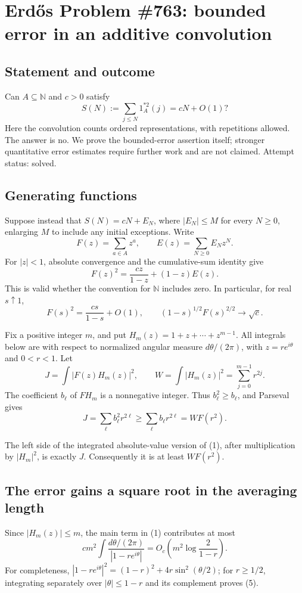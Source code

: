 \section*{Erd\H{o}s Problem \#763: bounded error in an additive convolution}
\subsection*{Statement and outcome}
Can \(A\subseteq\mathbb N\) and \(c>0\) satisfy
\[
S(N):=\sum_{j\leq N}1_A^{*2}(j)=cN+O(1)?
\]
Here the convolution counts ordered representations, with repetitions allowed. The answer is no. We prove the bounded-error assertion itself; stronger quantitative error estimates require further work and are not claimed. Attempt status: solved.

\subsection*{Generating functions}
Suppose instead that \(S(N)=cN+E_N\), where \(|E_N|\leq M\) for every \(N\geq0\), enlarging \(M\) to include any initial exceptions. Write
\[
F(z)=\sum_{a\in A}z^a,\qquad E(z)=\sum_{N\geq0}E_Nz^N.
\]
For \(|z|<1\), absolute convergence and the cumulative-sum identity give
\[
F(z)^2=\frac{cz}{1-z}+(1-z)E(z). \tag{1}
\]
This is valid whether the convention for \(\mathbb N\) includes zero. In particular, for real \(s\uparrow1\),
\[
F(s)^2=\frac{cs}{1-s}+O(1),\qquad
(1-s)^{1/2}F(s)^{2/2}\longrightarrow\sqrt c. \tag{2}
\]

Fix a positive integer \(m\), and put \(H_m(z)=1+z+\cdots+z^{m-1}\). All integrals below are with respect to normalized angular measure \(d\theta/(2\pi)\), with \(z=re^{i\theta}\) and \(0<r<1\). Let
\[
J=\int |F(z)H_m(z)|^2,\qquad W=\int|H_m(z)|^2=\sum_{j=0}^{m-1}r^{2j}.
\]
The coefficient \(b_\ell\) of \(F H_m\) is a nonnegative integer. Thus \(b_\ell^2\geq b_\ell\), and Parseval gives
\[
J=\sum_\ell b_\ell^2r^{2\ell}
 \geq\sum_\ell b_\ell r^{2\ell}=W F(r^2). \tag{3}
\]

The left side of the integrated absolute-value version of (1), after multiplication by \(|H_m|^2\), is exactly \(J\). Consequently it is at least \(W F(r^2)\).

\subsection*{The error gains a square root in the averaging length}
Since \(|H_m(z)|\leq m\), the main term in (1) contributes at most
\[
cm^2\int\frac{d\theta/(2\pi)}{|1-re^{i\theta}|}
=O_c\left(m^2\log\frac{2}{1-r}\right). \tag{5}
\]
For completeness, \(|1-re^{i\theta}|^2=(1-r)^2+4r\sin^2(\theta/2)\); for \(r\geq1/2\), integrating separately over \(|\theta|\leq1-r\) and its complement proves (5).


